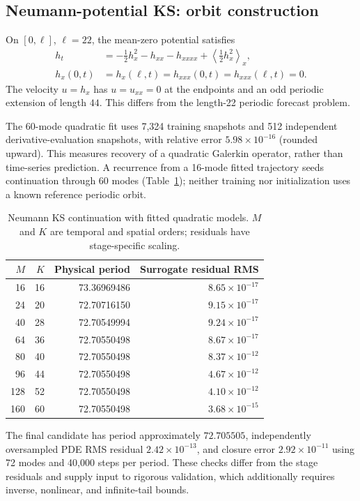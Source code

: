 \documentclass[11pt]{article}
\begin{document}
\subsection{Neumann-potential KS: orbit construction}
\label{sec:neumann-results}
On $[0,\ell]$, $\ell=22$, the mean-zero potential satisfies
\begin{align}
 h_t&=-\tfrac12h_x^2-h_{xx}-h_{xxxx}
       +\left\langle\tfrac12h_x^2\right\rangle_x,
 \label{eq:kspotential}\\
 h_x(0,t)&=h_x(\ell,t)=h_{xxx}(0,t)=h_{xxx}(\ell,t)=0.\nonumber
\end{align}
The velocity $u=h_x$ has $u=u_{xx}=0$ at the endpoints and an odd periodic
extension of length $44$. This differs from the length-22 periodic forecast
problem.

The 60-mode quadratic fit uses 7,324 training snapshots and 512 independent
derivative-evaluation snapshots, with relative error $5.98\times10^{-16}$
(rounded upward). This measures recovery of a quadratic Galerkin operator,
rather than time-series prediction. A recurrence from a 16-mode fitted
trajectory seeds continuation through 60 modes (Table~\ref{tab:continuation});
neither training nor initialization uses a known reference periodic orbit.

\begin{table}[htb]
\centering\small
\caption{Neumann KS continuation with fitted quadratic models. $M$ and $K$
are temporal and spatial orders; residuals have stage-specific scaling.}
\label{tab:continuation}
\begin{tabular}{rrrr}
\toprule
$M$ & $K$ & Physical period & Surrogate residual RMS\\
\midrule
16&16&73.36969486&$8.65\times10^{-17}$\\
24&20&72.70716150&$9.15\times10^{-17}$\\
40&28&72.70549994&$9.24\times10^{-17}$\\
64&36&72.70550498&$8.67\times10^{-17}$\\
80&40&72.70550498&$8.37\times10^{-12}$\\
96&44&72.70550498&$4.67\times10^{-12}$\\
128&52&72.70550498&$4.10\times10^{-12}$\\
160&60&72.70550498&$3.68\times10^{-15}$\\
\bottomrule
\end{tabular}
\end{table}

The final candidate has period approximately $72.705505$, independently
oversampled PDE RMS residual $2.42\times10^{-13}$, and closure error
$2.92\times10^{-11}$ using 72 modes and 40,000 steps per period.
These checks differ from the stage residuals and supply input to rigorous
validation, which additionally requires inverse, nonlinear, and infinite-tail
bounds.
\end{document}
